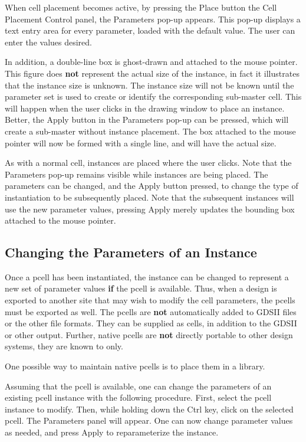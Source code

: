 When cell placement becomes active, by pressing the {\cb Place} button
the {\cb Cell Placement Control} panel, the {\cb Parameters} pop-up
appears.  This pop-up displays a text entry area for every parameter,
loaded with the default value.  The user can enter the values desired.

In addition, a double-line box is ghost-drawn and attached to the
mouse pointer.  This figure does {\bf not} represent the actual size
of the instance, in fact it illustrates that the instance size is
unknown.  The instance size will not be known until the parameter set
is used to create or identify the corresponding sub-master cell.  This
will happen when the user clicks in the drawing window to place an
instance.  Better, the {\cb Apply} button in the {\cb Parameters}
pop-up can be pressed, which will create a sub-master without instance
placement.  The box attached to the mouse pointer will now be formed
with a single line, and will have the actual size.

As with a normal cell, instances are placed where the user clicks. 
Note that the {\cb Parameters} pop-up remains visible while instances
are being placed.  The parameters can be changed, and the {\cb Apply}
button pressed, to change the type of instantiation to be subsequently
placed.  Note that the subsequent instances will use the new parameter
values, pressing {\cb Apply} merely updates the bounding box attached
to the mouse pointer.

\subsection{Changing the Parameters of an Instance}

Once a pcell has been instantiated, the instance can be changed to
represent a new set of parameter values {\bf if} the pcell is
available.  Thus, when a design is exported to another site that may
wish to modify the cell parameters, the pcells must be exported as
well.  The pcells are {\bf not} automatically added to GDSII files or
the other file formats.  They can be supplied as {\Xic} cells, in
addition to the GDSII or other output.  Further, {\Xic} native pcells
are {\bf not} directly portable to other design systems, they are
known to {\Xic} only.

One possible way to maintain native pcells is to place them
in a library.

Assuming that the pcell is available, one can change the parameters of
an existing pcell instance with the following procedure.  First,
select the pcell instance to modify.  Then, while holding down the
{\kb Ctrl} key, click on the selected pcell.  The {\cb Parameters}
panel will appear.  One can now change parameter values as needed, and
press {\cb Apply} to reparameterize the instance.


